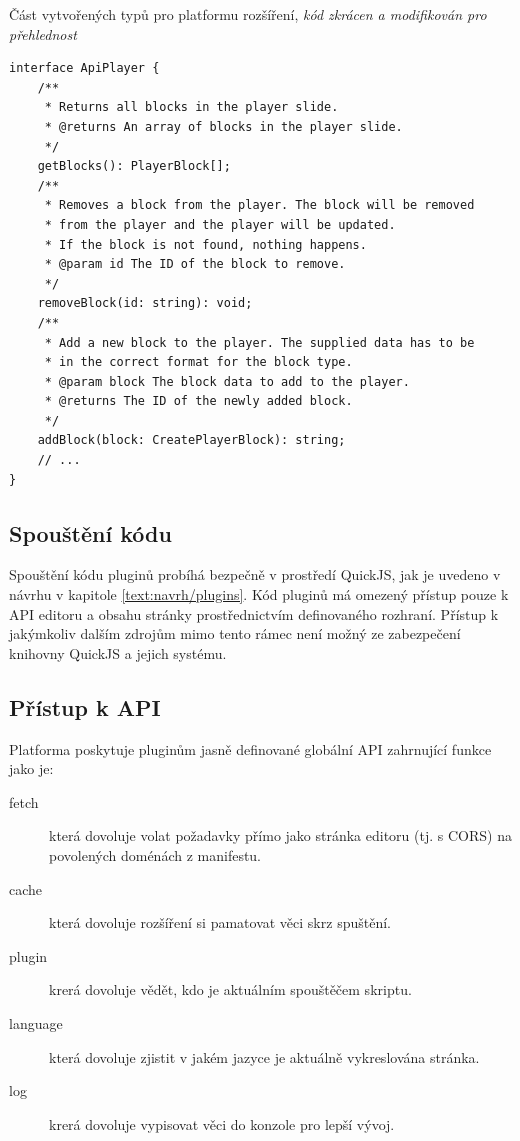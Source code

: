 \begin{listing}[ht!]
\caption[Část vytvořených typů pro platformu rozšíření]{Část vytvořených typů pro platformu rozšíření, \textit{kód zkrácen a modifikován pro přehlednost}}\label{code:realizace/typy}
\begin{verbatim}
interface ApiPlayer {
    /**
     * Returns all blocks in the player slide.
     * @returns An array of blocks in the player slide.
     */
    getBlocks(): PlayerBlock[];
    /**
     * Removes a block from the player. The block will be removed 
     * from the player and the player will be updated.
     * If the block is not found, nothing happens.
     * @param id The ID of the block to remove.
     */
    removeBlock(id: string): void;
    /**
     * Add a new block to the player. The supplied data has to be
     * in the correct format for the block type.
     * @param block The block data to add to the player.
     * @returns The ID of the newly added block.
     */
    addBlock(block: CreatePlayerBlock): string;
    // ...
}
\end{verbatim}
\end{listing}

\subsection{Spouštění kódu}

Spouštění kódu pluginů probíhá bezpečně v prostředí QuickJS, jak je uvedeno v návrhu v kapitole \ref{text:navrh/plugins}. 
Kód pluginů má omezený přístup pouze k API editoru a obsahu stránky prostřednictvím definovaného rozhraní. 
Přístup k jakýmkoliv dalším zdrojům mimo tento rámec není možný ze zabezpečení knihovny QuickJS a jejich systému.

\subsection{Přístup k API}

Platforma poskytuje pluginům jasně definované globální API zahrnující funkce jako je:

\begin{description}
    \item[fetch] která dovoluje volat požadavky přímo jako stránka editoru (tj. s CORS) na povolených doménách z manifestu.
    \item[cache] která dovoluje rozšíření si pamatovat věci skrz spuštění.
    \item[plugin] krerá dovoluje vědět, kdo je aktuálním spouštěčem skriptu.
    \item[language] která dovoluje zjistit v jakém jazyce je aktuálně vykreslována stránka.
    \item[log] krerá dovoluje vypisovat věci do konzole pro lepší vývoj.
\end{description}

